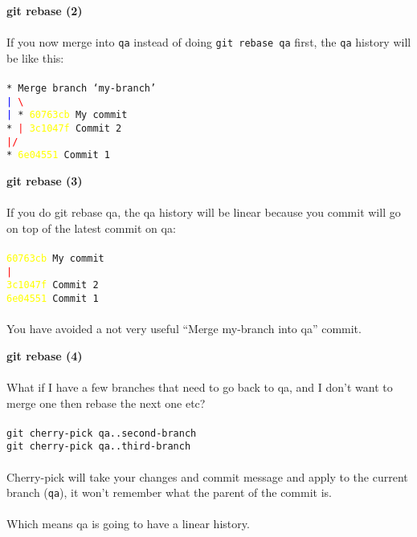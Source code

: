 \documentclass[landscape]{slides}
\begin{document}
\begin{slide}
\textbf{git rebase (2)}\\
\\
If you now merge into {\tt qa} instead of doing {\tt git rebase qa} first, the
{\tt qa} history will be like this:\\
\\
\tt{*    Merge branch `my-branch'}\\
\tt{\textcolor{blue}{|} \textcolor{red}{\textbackslash}}\\
\tt{\textcolor{blue}{|} * \textcolor{yellow}{60763cb} My commit}\\
\tt{* \textcolor{red}{|} \textcolor{yellow}{3c1047f} Commit 2}\\
\textcolor{red}{\tt{|/}}\\
\tt{* \textcolor{yellow}{6e04551} Commit 1}\\
\end{slide}

\begin{slide}
\textbf{git rebase (3)}\\
\\
If you do git rebase qa, the qa history will be linear because you commit will
go on top of the latest commit on qa:\\
\\
{\tt* \textcolor{yellow}{60763cb} My commit}\\
\textcolor{red}{\tt{|}}\\
{\tt* \textcolor{yellow}{3c1047f} Commit 2}\\
{\tt* \textcolor{yellow}{6e04551} Commit 1}\\
\\
You have avoided a not very useful ``Merge my-branch into qa'' commit.\\
\end{slide}

\begin{slide}
\textbf{git rebase (4)}\\
\\
What if I have a few branches that need to go back to qa, and I don't want to
merge one then rebase the next one etc?\\
\\
{\tt git cherry-pick qa..second-branch}\\
{\tt git cherry-pick qa..third-branch}\\
\\
Cherry-pick will take your changes and commit message and apply to the current
branch ({\tt qa}), it won't remember what the parent of the commit is.\\
\\
Which means qa is going to have a linear history.
\end{slide}
\end{document}

